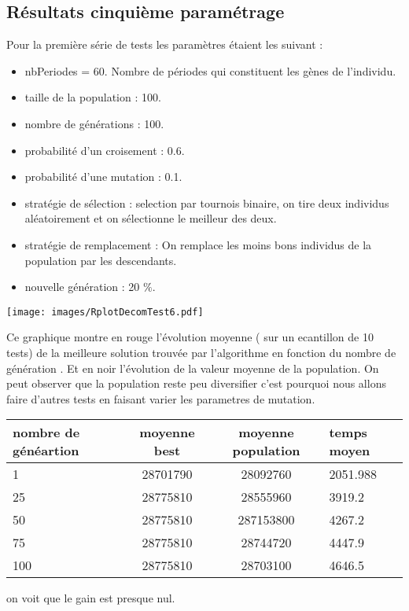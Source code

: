 \documentclass[a4paper]{report}
\begin{document}
\subsection{Résultats cinquième paramétrage}
Pour la première série de tests les paramètres étaient les suivant :\\

\begin{itemize}
\item nbPeriodes = 60. Nombre de périodes qui constituent les gènes de l'individu.
\item taille de la population : 100.
\item nombre de générations : 100.
\item probabilité d'un croisement : 0.6.
\item probabilité d'une mutation : 0.1.
\item stratégie de sélection : selection par tournois binaire, on tire deux individus aléatoirement et on sélectionne le meilleur des deux.
\item stratégie de remplacement : On remplace les moins bons individus de la population par les descendants.
\item nouvelle génération : 20 $\%$.

\end{itemize}
\begin{center}
\texttt{[image: images/RplotDecomTest6.pdf]}
\end{center}
Ce graphique montre  en rouge l'évolution moyenne ( sur un ecantillon de 10 tests) de la  meilleure solution trouvée par l'algorithme en fonction du nombre de génération . Et en noir l'évolution de la valeur moyenne de la population. On peut observer que la population reste peu diversifier c'est pourquoi nous allons faire d'autres tests en faisant varier les parametres de mutation.\\
\begin{tabular}{|l|c|c|l|}
  \hline
  nombre de généartion &moyenne best &moyenne population&temps moyen\\

  \hline
 1 &28701790&28092760& 2051.988\\
  \hline
25 & 28775810& 28555960& 3919.2
\\
  \hline
  50&  28775810&287153800&4267.2
\\
  \hline
  75 &28775810& 28744720&4447.9


\\
  \hline
 100 &  28775810&28703100& 4646.5 \\
  \hline


\end{tabular}
on voit que le gain est presque nul.
\end{document}
